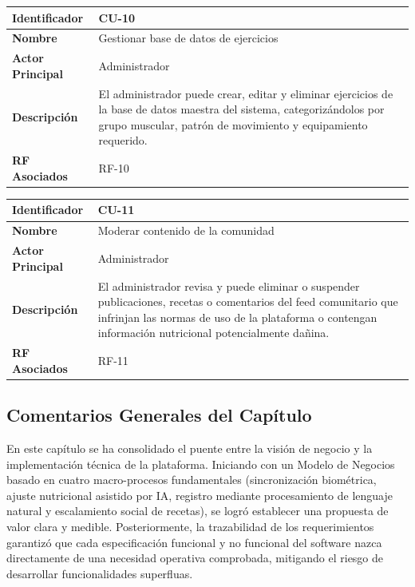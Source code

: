 \documentclass[12pt]{article}
\begin{document}
\begin{table}[h!]
    \centering
    \renewcommand{\arraystretch}{1.3}
    \begin{tabular}{|p{3.5cm}|p{11.5cm}|}
        \hline
        \rowcolor[HTML]{EFEFEF}
        \textbf{Identificador} & \textbf{CU-10} \\ \hline
        \textbf{Nombre} & Gestionar base de datos de ejercicios \\ \hline
        \textbf{Actor Principal} & Administrador \\ \hline
        \textbf{Descripción} & El administrador puede crear, editar y eliminar ejercicios de la base de datos maestra del sistema, categorizándolos por grupo muscular, patrón de movimiento y equipamiento requerido. \\ \hline
        \textbf{RF Asociados} & RF-10 \\ \hline
    \end{tabular}
\end{table}
\newpage
\begin{table}[ht!]
    \centering
    \renewcommand{\arraystretch}{1.3}
    \begin{tabular}{|p{3.5cm}|p{11.5cm}|}
        \hline
        \rowcolor[HTML]{EFEFEF}
        \textbf{Identificador} & \textbf{CU-11} \\ \hline
        \textbf{Nombre} & Moderar contenido de la comunidad \\ \hline
        \textbf{Actor Principal} & Administrador \\ \hline
        \textbf{Descripción} & El administrador revisa y puede eliminar o suspender publicaciones, recetas o comentarios del feed comunitario que infrinjan las normas de uso de la plataforma o contengan información nutricional potencialmente dañina. \\ \hline
        \textbf{RF Asociados} & RF-11 \\ \hline
    \end{tabular}
\end{table}
\subsection{Comentarios Generales del Capítulo}
En este capítulo se ha consolidado el puente entre la visión de negocio y la implementación técnica de la plataforma. Iniciando con un Modelo de Negocios basado en cuatro macro-procesos fundamentales (sincronización biométrica, ajuste nutricional asistido por IA, registro mediante procesamiento de lenguaje natural y escalamiento social de recetas), se logró establecer una propuesta de valor clara y medible. Posteriormente, la trazabilidad de los requerimientos garantizó que cada especificación funcional y no funcional del software nazca directamente de una necesidad operativa comprobada, mitigando el riesgo de desarrollar funcionalidades superfluas. 
\end{document}
